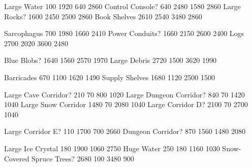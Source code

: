 \def\tilejpg{terrain-002.jpg}

  {Large Water} {100 1920 640 2860}
  {Control Console?} {640 2480 1580 2860}
  {Large Rocks?} {1600 2450 2500 2860}
  {Book Shelves} {2610 2540 3480 2860}

  {Sarcophagus} {700 1980 1660 2410}
  {Power Conduits?} { 1660 2150 2600 2400}
  {Logs} { 2700 2020 3600 2480}

  {Blue Blobs?} {1640 1560 2570 1970}
  {Large Debris} {2720 1500 3620 1990}

  {Barricades} {670 1100 1620 1490}
  {Supply Shelves} {1680 1120 2500 1500}

  {Large Cave Corridor?} {210 70 800 1020}
  {Large Dungeon Corridor?} {840 70 1420 1040}
  {Large Snow Corridor} {1480 70 2080 1040}
  {Large Corridor D?} {2100 70 2700 1040}

\def\tilejpg{annotated-002.jpg}

  {Large Corridor E?} { 110 1700 700 2660}
  {Dungeon Corridor?} { 870 1560 1480 2080}

\def\tilejpg{terrain-004.jpg}

 {Large Ice Crystal} { 180 1900 1060 2750}
 {Huge Water} {250 180 1160 1030}
 {Snow-Covered Spruce Trees?} { 2680 100 3480 900}

